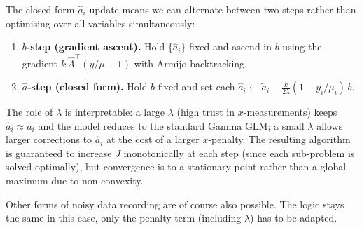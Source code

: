 \documentclass{article}
\begin{document}
The closed-form $\hat{a}_i$-update means we can alternate between two steps rather than optimising over all variables simultaneously:

\vspace{2mm}
\begin{enumerate}
    \item \textbf{$b$-step (gradient ascent).} Hold $\{\hat{a}_i\}$ fixed and ascend in $b$ using the gradient $k\,\hat{A}^\top(y/\mu - \mathbf{1})$ with Armijo backtracking.
    \item \textbf{$\hat{a}$-step (closed form).} Hold $b$ fixed and set each $\hat{a}_i \leftarrow \tilde{a}_i - \frac{k}{2\lambda}(1 - y_i/\mu_i)\,b$.
\end{enumerate}
\vspace{2mm}

The role of $\lambda$ is interpretable: a large $\lambda$ (high trust in $x$-measurements) keeps $\hat{a}_i \approx \tilde{a}_i$ and the model reduces to the standard Gamma GLM; a small $\lambda$ allows larger corrections to $\hat{a}_i$ at the cost of a larger $x$-penalty. The resulting algorithm is guaranteed to increase $J$ monotonically at each step (since each sub-problem is solved optimally), but convergence is to a stationary point rather than a global maximum due to non-convexity.

\vspace{3mm}
Other forms of noisy data recording are of course also possible. The logic stays the same in this case, only the penalty term (including $\lambda$) has to be adapted.
\end{document}
